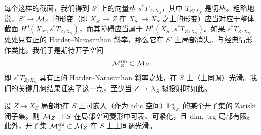 \providecommand{\fsSat}{\operatorname{Sat}}
\providecommand{\fsPerf}{\operatorname{Perf}}
\providecommand{\fsZ}{\mathrm{Z}}
\providecommand{\fsBZ}{D_{\mathrm{BZ}}}
\providecommand{\fslis}{D_{\mathrm{lis}}}
\providecommand{\fsrt}{\mathrm{rt}}
\providecommand{\fsdim}{\operatorname{dim}}
\providecommand{\fsHom}{\operatorname{Hom}}
\providecommand{\fsblk}{\blacksquare}
\providecommand{\fsCT}{\operatorname{CT}}
\providecommand{\fsHck}{\mathcal{H}\mathrm{ck}}
\providecommand{\Spd}{\operatorname{Spd}}
\providecommand{\fsL}{\mathbb{L}}


每个这样的截面，我们得到 $S'$ 上的向量丛 $s^*T_{Z/X_S}$，其中 $T_{Z/X_S}$ 是切丛。粗略地说，$S'\to\mathcal{M}_Z$ 的形变（即 $X_{S'}\to Z$ 在 $X_{S'}\to X_S$ 之上的形变）应当对应于整体截面 $H^0(X_{S'},s^*T_{Z/X_S})$，而其障碍应当属于 $H^1(X_{S'},s^*T_{Z/X_S})$。如果 $s^*T_{Z/X_S}$ 处处只有正的 Harder–Narasimhan 斜率，那么它在 $S'$ 上局部消失。与经典情形作类比，我们于是期待开子空间
\[
\mathcal{M}_Z^{\mathrm{sm}}\subset\mathcal{M}_Z,
\]
即 $s^*T_{Z/X_S}$ 具有正的 Harder–Narasimhan 斜率之处，在 $S$ 上（上同调）光滑。我们的关键几何结果证实了这一点，至少当 $Z\to X_S$ 拟投射时如此。

\begin{theorem}%
设 $Z\to X_S$ 局部地在 $S$ 上可嵌入（作为 adic 空间）$\mathbb{P}^n_{X_S}$ 的某个开子集的 Zariski 闭子集。则 $\mathcal{M}_Z\to S$ 在局部空间菱形中可表、可紧化，且 dim.\ trg 局部有限。此外，开子集 $\mathcal{M}_Z^{\mathrm{sm}}\subset\mathcal{M}_Z$ 在 $S$ 上上同调光滑。
\end{theorem}



